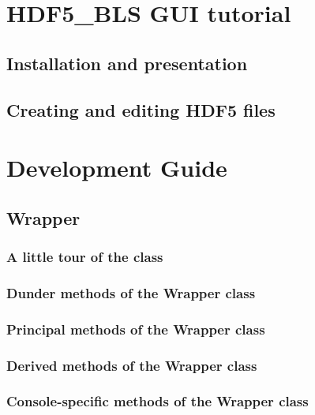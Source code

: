 \documentclass{book}
\newcommand{\mypart}[1]{\setcounter{chapter}{0} \part{#1}}
\begin{document}
\mypart{HDF5\_BLS GUI tutorial}\label{part:GUI_tutorial}
    \chapter{Installation and presentation}\label{chapter:HDF5_BLS_GUI.installation}
        

    \chapter{Creating and editing HDF5 files}
        



\mypart{Development Guide} \label{part:dev_guide}
    \chapter{Wrapper}\label{chapter:wrapper}
        \section{A little tour of the class}
            
        
        \section{Dunder methods of the Wrapper class}
            

        \section{Principal methods of the Wrapper class}
            

        \section{Derived methods of the Wrapper class}
            

        \section{Console-specific methods of the Wrapper class}
            
\end{document}

